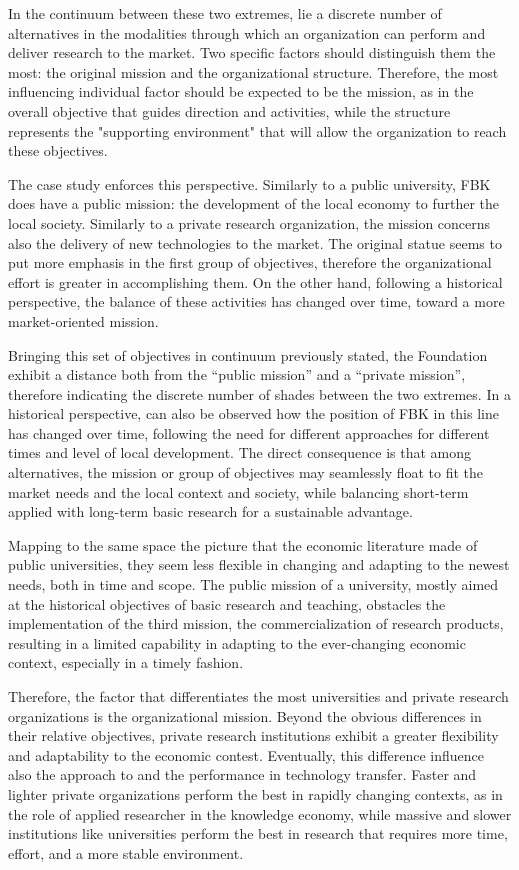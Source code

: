 In the continuum between these two extremes, lie a discrete number of alternatives in the modalities through which an organization can perform and deliver research to the market. Two specific factors should distinguish them the most: the original mission and the organizational structure. Therefore, the most influencing individual factor should be expected to be the mission, as in the overall objective that guides direction and activities, while the structure represents the "supporting environment" that will allow the organization to reach these objectives. 

The case study enforces this perspective. Similarly to a public university, FBK does have a public mission: the development of the local economy to further the local society. Similarly to a private research organization, the mission concerns also the delivery of new technologies to the market. The original statue seems to put more emphasis in the first group of objectives, therefore the organizational effort is greater in accomplishing them. On the other hand, following a historical perspective, the balance of these activities has changed over time, toward a more market-oriented mission.

Bringing this set of objectives in continuum previously stated, the Foundation exhibit a distance both from the \enquote{public mission} and a \enquote{private mission}, therefore indicating the discrete number of shades between the two extremes. In a historical perspective, can also be observed how the position of FBK in this line has changed over time, following the need for different approaches for different times and level of local development. The direct consequence is that among alternatives, the mission or group of objectives may seamlessly float to fit the market needs and the local context and society, while balancing short-term applied with long-term basic research for a sustainable advantage.

Mapping to the same space the picture that the economic literature made of public universities, they seem less flexible in changing and adapting to the newest needs, both in time and scope. The public mission of a university, mostly aimed at the historical objectives of basic research and teaching, obstacles the implementation of the third mission, the commercialization of research products, resulting in a limited capability in adapting to the ever-changing economic context, especially in a timely fashion.

Therefore, the factor that differentiates the most universities and private research organizations is the organizational mission. Beyond the obvious differences in their relative objectives, private research institutions exhibit a greater flexibility and adaptability to the economic contest. Eventually, this difference influence also the approach to and the performance in technology transfer. Faster and lighter private organizations perform the best in rapidly changing contexts, as in the role of applied researcher in the knowledge economy, while massive and slower institutions like universities perform the best in research that requires more time, effort, and a more stable environment.

